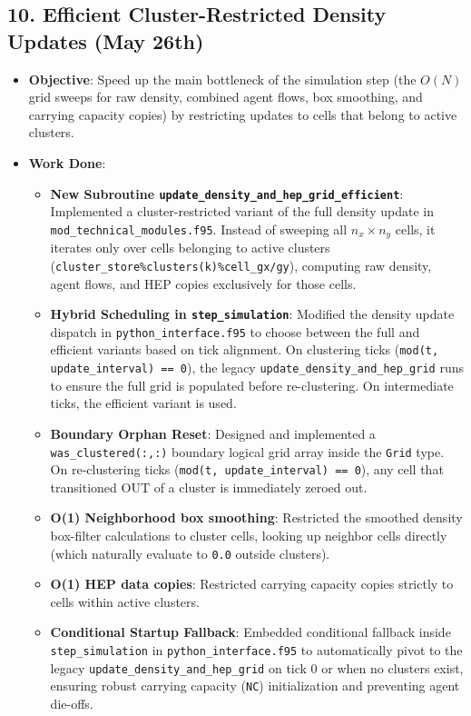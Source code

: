 \subsection{10. Efficient Cluster-Restricted Density Updates (May 26th)}
\begin{itemize}
\item \textbf{Objective}: Speed up the main bottleneck of the simulation step (the $O(N)$ grid sweeps for raw density, combined agent flows, box smoothing, and carrying capacity copies) by restricting updates to cells that belong to active clusters.
\item \textbf{Work Done}:
\begin{itemize}
\item \textbf{New Subroutine \texttt{update\_density\_and\_hep\_grid\_efficient}}: Implemented a cluster-restricted variant of the full density update in \texttt{mod\_technical\_modules.f95}. Instead of sweeping all $n_x \times n_y$ cells, it iterates only over cells belonging to active clusters (\texttt{cluster\_store\%clusters(k)\%cell\_gx/gy}), computing raw density, agent flows, and HEP copies exclusively for those cells.
\item \textbf{Hybrid Scheduling in \texttt{step\_simulation}}: Modified the density update dispatch in \texttt{python\_interface.f95} to choose between the full and efficient variants based on tick alignment. On clustering ticks (\texttt{mod(t, update\_interval) == 0}), the legacy \texttt{update\_density\_and\_hep\_grid} runs to ensure the full grid is populated before re-clustering. On intermediate ticks, the efficient variant is used.
\item \textbf{Boundary Orphan Reset}: Designed and implemented a \texttt{was\_clustered(:,:)} boundary logical grid array inside the \texttt{Grid} type. On re-clustering ticks (\texttt{mod(t, update\_interval) == 0}), any cell that transitioned OUT of a cluster is immediately zeroed out.
\item \textbf{O(1) Neighborhood box smoothing}: Restricted the smoothed density box-filter calculations to cluster cells, looking up neighbor cells directly (which naturally evaluate to \texttt{0.0} outside clusters).
\item \textbf{O(1) HEP data copies}: Restricted carrying capacity copies strictly to cells within active clusters.
\item \textbf{Conditional Startup Fallback}: Embedded conditional fallback inside \texttt{step\_simulation} in \texttt{python\_interface.f95} to automatically pivot to the legacy \texttt{update\_density\_and\_hep\_grid} on tick 0 or when no clusters exist, ensuring robust carrying capacity (\texttt{NC}) initialization and preventing agent die-offs.

\end{itemize}
\end{itemize}
